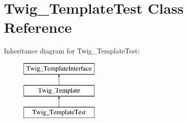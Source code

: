 \hypertarget{classTwig__TemplateTest}{}\section{Twig\+\_\+\+Template\+Test Class Reference}
\label{classTwig__TemplateTest}
Inheritance diagram for Twig\+\_\+\+Template\+Test\+:\begin{figure}[H]
\begin{center}
\leavevmode
\includegraphics[height=3.000000cm]{classTwig__TemplateTest}
\end{center}
\end{figure}
